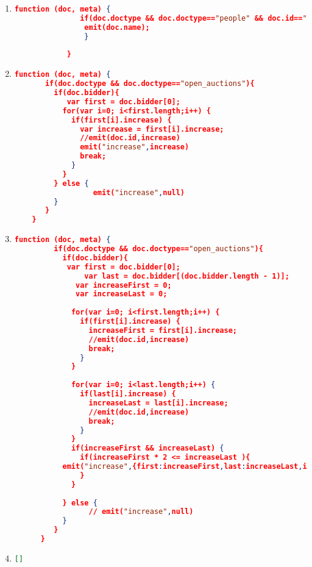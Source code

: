 \label{xmark-queries-couchbase}
\begin{enumerate}[label=Q\arabic*.]
	\item %
	\begin{lstlisting}[language=JSON, basicstyle=\scriptsize]
			function (doc, meta) {
			   if(doc.doctype && doc.doctype=="people" && doc.id=="person0"){
				emit(doc.name);	   
			    }
			  
			}
		\end{lstlisting}

	\item %
	\begin{lstlisting}[language=JSON, basicstyle=\scriptsize]
	function (doc, meta) {
	   if(doc.doctype && doc.doctype=="open_auctions"){
	     if(doc.bidder){
	     	var first = doc.bidder[0];
	       for(var i=0; i<first.length;i++) {
	         if(first[i].increase) {
	           var increase = first[i].increase;
	           //emit(doc.id,increase)
	           emit("increase",increase)
	           break;
	         }
	       }
	     } else {
	     	      emit("increase",null)
	     }
	   }
	}
	\end{lstlisting}
	
    \item %
	\begin{lstlisting}[language=JSON, basicstyle=\scriptsize]
	  function (doc, meta) {
	     if(doc.doctype && doc.doctype=="open_auctions"){
	       if(doc.bidder){
	       	var first = doc.bidder[0];
	         	var last = doc.bidder[(doc.bidder.length - 1)];
	          var increaseFirst = 0;
	          var increaseLast = 0;
	         
	         for(var i=0; i<first.length;i++) {
	           if(first[i].increase) {
	             increaseFirst = first[i].increase;
	             //emit(doc.id,increase)
	             break;
	           }
	         }
	         
	         for(var i=0; i<last.length;i++) {
	           if(last[i].increase) {
	             increaseLast = last[i].increase;
	             //emit(doc.id,increase)
	             break;
	           }
	         }
	         if(increaseFirst && increaseLast) {
	           if(increaseFirst * 2 <= increaseLast ){
	  	   emit("increase",{first:increaseFirst,last:increaseLast,id:doc.id});
	           }
	         }
	         
	       } else {
	       	     // emit("increase",null)
	       }
	     }
	  }
	\end{lstlisting}
	
	
    \item %
	\begin{lstlisting}[language=JSON, basicstyle=\scriptsize]
	   []
	\end{lstlisting}
	

\end{enumerate}

